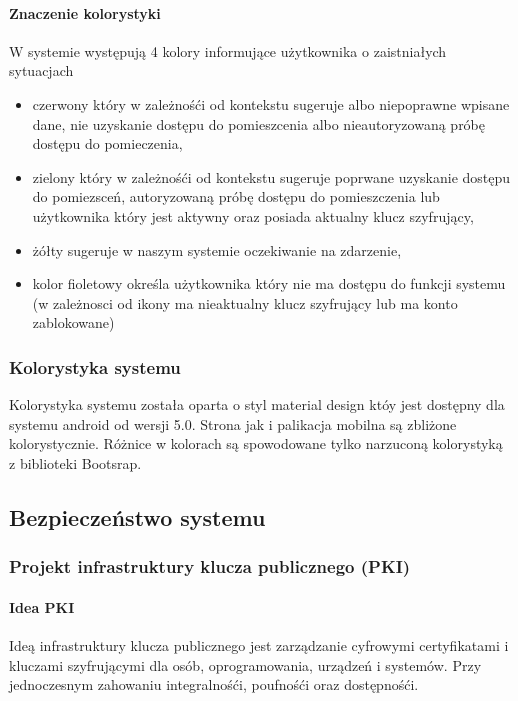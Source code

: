 	
		\paragraph*{Znaczenie kolorystyki}
		W systemie występują 4 kolory informujące użytkownika o zaistniałych sytuacjach
		\begin{itemize}
			\item czerwony który w zależnośći od kontekstu sugeruje albo niepoprawne wpisane dane, nie uzyskanie dostępu do pomieszcenia albo nieautoryzowaną próbę dostępu do pomieczenia,
			\item zielony który w zależnośći od kontekstu sugeruje poprwane uzyskanie dostępu do pomiezsceń, autoryzowaną próbę dostępu do pomieszczenia lub użytkownika który jest aktywny oraz posiada aktualny klucz szyfrujący,
			\item żółty sugeruje w naszym systemie oczekiwanie na zdarzenie,
			\item kolor fioletowy określa użytkownika który nie ma dostępu do funkcji systemu (w zależnosci od ikony ma nieaktualny klucz szyfrujący lub ma konto zablokowane)
		\end{itemize}
		
	\subsubsection{Kolorystyka systemu}
	Kolorystyka systemu została oparta o styl material design któy jest dostępny dla systemu android od wersji 5.0. Strona jak i palikacja mobilna są zbliżone kolorystycznie. Różnice w kolorach są spowodowane tylko narzuconą kolorystyką z biblioteki Bootsrap.
	
\newpage
\subsection{Bezpieczeństwo systemu}\label{sec:Projekt bezpieczeństwo}
	\subsubsection{Projekt infrastruktury klucza publicznego (PKI)}\label{sec:Projekt PKI}
		\paragraph*{Idea PKI}
		Ideą infrastruktury klucza publicznego jest zarządzanie cyfrowymi certyfikatami i kluczami szyfrującymi dla osób, oprogramowania, urządzeń i systemów. Przy jednoczesnym zahowaniu integralnośći, poufnośći oraz dostępnośći.
